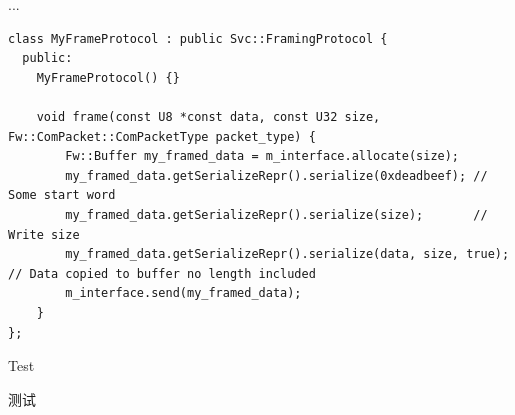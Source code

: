 \documentclass[UTF8, oneside]{ctexbook}
\begin{document}
\begin{paracol}{2}
\begin{rightcolumn}
    ...
  \end{rightcolumn}

  \begin{leftcolumn*}
    \begin{minipage}{.94\textwidth}
      \begin{lstlisting}
class MyFrameProtocol : public Svc::FramingProtocol {
  public:
    MyFrameProtocol() {}

    void frame(const U8 *const data, const U32 size, Fw::ComPacket::ComPacketType packet_type) {
        Fw::Buffer my_framed_data = m_interface.allocate(size);
        my_framed_data.getSerializeRepr().serialize(0xdeadbeef); // Some start word
        my_framed_data.getSerializeRepr().serialize(size);       // Write size
        my_framed_data.getSerializeRepr().serialize(data, size, true); // Data copied to buffer no length included
        m_interface.send(my_framed_data);
    }
};
    \end{lstlisting}
    \end{minipage}
  \end{leftcolumn*}
  
  \begin{leftcolumn*}
    Test
  \end{leftcolumn*}
  \begin{rightcolumn}
    测试
  \end{rightcolumn}
  
\end{paracol}
\end{document}
